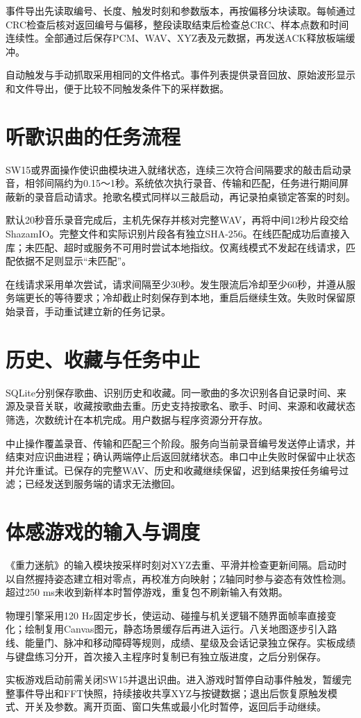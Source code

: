 事件导出先读取编号、长度、触发时刻和参数版本，再按偏移分块读取。每帧通过CRC检查后核对返回编号与偏移，整段读取结束后检查总CRC、样本点数和时间连续性。全部通过后保存PCM、WAV、XYZ表及元数据，再发送ACK释放板端缓冲。

自动触发与手动抓取采用相同的文件格式。事件列表提供录音回放、原始波形显示和文件导出，便于比较不同触发条件下的采样数据。

\section{听歌识曲的任务流程}
SW15或界面操作使识曲模块进入就绪状态，连续三次符合间隔要求的敲击启动录音，相邻间隔约为0.15～1秒。系统依次执行录音、传输和匹配，任务进行期间屏蔽新的录音启动请求。抢歌名模式同样以三敲启动，再记录拍桌锁定答案的时刻。


默认20秒音乐录音完成后，主机先保存并核对完整WAV，再将中间12秒片段交给ShazamIO。完整文件和实际识别片段各有独立SHA-256。在线匹配成功后直接入库；未匹配、超时或服务不可用时尝试本地指纹。仅离线模式不发起在线请求，匹配依据不足则显示“未匹配”。

在线请求采用单次尝试，请求间隔至少30秒。发生限流后冷却至少60秒，并遵从服务端更长的等待要求；冷却截止时刻保存到本地，重启后继续生效。失败时保留原始录音，手动重试建立新的任务记录。

\section{历史、收藏与任务中止}
SQLite分别保存歌曲、识别历史和收藏。同一歌曲的多次识别各自记录时间、来源及录音关联，收藏按歌曲去重。历史支持按歌名、歌手、时间、来源和收藏状态筛选，次数统计在本机完成。用户数据与程序资源分开存放。

中止操作覆盖录音、传输和匹配三个阶段。服务向当前录音编号发送停止请求，并结束对应识曲进程；确认两端停止后返回就绪状态。串口中止失败时保留中止状态并允许重试。已保存的完整WAV、历史和收藏继续保留，迟到结果按任务编号过滤；已经发送到服务端的请求无法撤回。

\section{体感游戏的输入与调度}
《重力迷航》的输入模块按采样时刻对XYZ去重、平滑并检查更新间隔。启动时以自然握持姿态建立相对零点，再校准方向映射；Z轴同时参与姿态有效性检测。超过250 ms未收到新样本时暂停游戏，重复包不刷新输入有效期。


物理引擎采用120 Hz固定步长，使运动、碰撞与机关逻辑不随界面帧率直接变化；绘制复用Canvas图元，静态场景缓存后再进入运行。八关地图逐步引入路线、能量门、脉冲和移动障碍等规则，成绩、星级及会话记录独立保存。实板成绩与键盘练习分开，首次接入主程序时复制已有独立版进度，之后分别保存。

实板游戏启动前需关闭SW15并退出识曲。进入游戏时暂停自动事件触发，暂缓完整事件导出和FFT快照，持续接收共享XYZ与按键数据；退出后恢复原触发模式、开关及参数。离开页面、窗口失焦或最小化时暂停，返回后手动继续。

